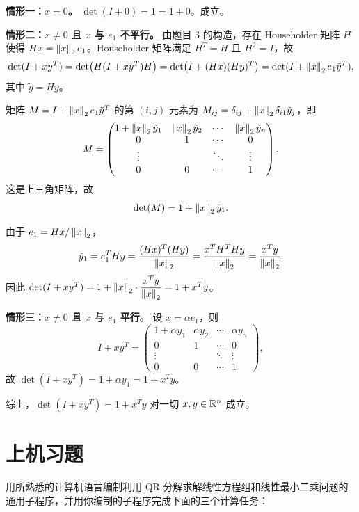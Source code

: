 \documentclass{article}
\begin{document}
\begin{solution}

  \textbf{情形一：$x = 0$。} $\det(I + 0) = 1 = 1 + 0$。成立。

  \textbf{情形二：$x \neq 0$ 且 $x$ 与 $e_1$ 不平行。} 由题目 3 的构造，存在 Householder
  矩阵 $H$ 使得 $Hx = \left\| x \right\|_2 e_1$。Householder 矩阵满足 $H^T = H$ 且 $H^2 = I$，故
  \[
    \det(I + xy^T) = \det\bigl(H(I + xy^T)H\bigr)
    = \det\bigl(I + (Hx)(Hy)^T\bigr)
    = \det(I + \left\| x \right\|_2 e_1 \tilde{y}^T),
  \]
  其中 $\tilde{y} = Hy$。

  矩阵 $M = I + \left\| x \right\|_2 e_1 \tilde{y}^T$ 的第 $(i,j)$ 元素为 $M_{ij} =
  \delta_{ij} + \left\| x \right\|_2 \delta_{i1} \tilde{y}_j$，即
  \[
    M =
    \begin{pmatrix}
      1 + \left\| x \right\|_2 \tilde{y}_1 & \left\| x \right\|_2 \tilde{y}_2 & \cdots &
      \left\| x \right\|_2 \tilde{y}_n \\
      0 & 1 & \cdots & 0 \\
      \vdots & & \ddots & \vdots \\
      0 & 0 & \cdots & 1
    \end{pmatrix}.
  \]
  这是上三角矩阵，故
  \[
    \det(M) = 1 + \left\| x \right\|_2 \tilde{y}_1.
  \]

  由于 $e_1 = Hx / \left\| x \right\|_2$，
  \[
    \tilde{y}_1 = e_1^T Hy = \frac{(Hx)^T(Hy)}{\left\| x \right\|_2}
    = \frac{x^T H^T H y}{\left\| x \right\|_2} = \frac{x^T y}{\left\| x \right\|_2}.
  \]
  因此 $\det(I + xy^T) = 1 + \left\| x \right\|_2 \cdot \dfrac{x^T y}{\left\| x \right\|_2}
  = 1 + x^T y$。

  \textbf{情形三：$x \neq 0$ 且 $x$ 与 $e_1$ 平行。} 设 $x = \alpha e_1$，则
  \[
    I + xy^T =
    \begin{pmatrix}
      1 + \alpha y_1 & \alpha y_2 & \cdots & \alpha y_n \\
      0 & 1 & \cdots & 0 \\
      \vdots & & \ddots & \vdots \\
      0 & 0 & \cdots & 1
    \end{pmatrix},
  \]
  故 $\det(I + xy^T) = 1 + \alpha y_1 = 1 + x^T y$。

  综上，$\det(I + xy^T) = 1 + x^T y$ 对一切 $x, y \in \mathbb{R}^n$ 成立。

\end{solution}

\section{上机习题}

用所熟悉的计算机语言编制利用 QR 分解求解线性方程组和线性最小二乘问题的通用子程序，并用你编制的子程序完成下面的三个计算任务：
\end{document}
